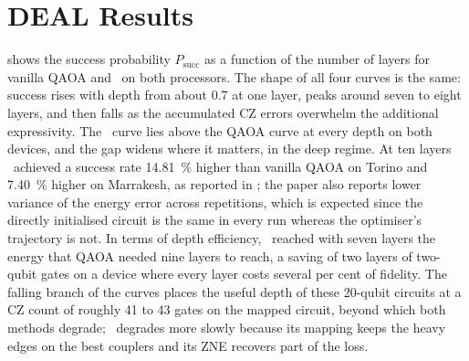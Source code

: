 \section{DEAL Results}\label{sec:nisq:deal-results}

 shows the success probability $P_{\mathrm{succ}}$ as a function of the number of layers for vanilla QAOA and \deal\ on both processors. The shape of all four curves is the same: success rises with depth from about 0.7 at one layer, peaks around seven to eight layers, and then falls as the accumulated CZ errors overwhelm the additional expressivity. The \deal\ curve lies above the QAOA curve at every depth on both devices, and the gap widens where it matters, in the deep regime. At ten layers \deal\ achieved a success rate \SI{14.81}{\percent} higher than vanilla QAOA on Torino and \SI{7.40}{\percent} higher on Marrakesh, as reported in \cite{guo2025deal}; the paper also reports lower variance of the energy error across repetitions, which is expected since the directly initialised circuit is the same in every run whereas the optimiser's trajectory is not. In terms of depth efficiency, \deal\ reached with seven layers the energy that QAOA needed nine layers to reach, a saving of two layers of two-qubit gates on a device where every layer costs several per cent of fidelity. The falling branch of the curves places the useful depth of these 20-qubit circuits at a CZ count of roughly 41 to 43 gates on the mapped circuit, beyond which both methods degrade; \deal\ degrades more slowly because its mapping keeps the heavy edges on the best couplers and its ZNE recovers part of the loss.

